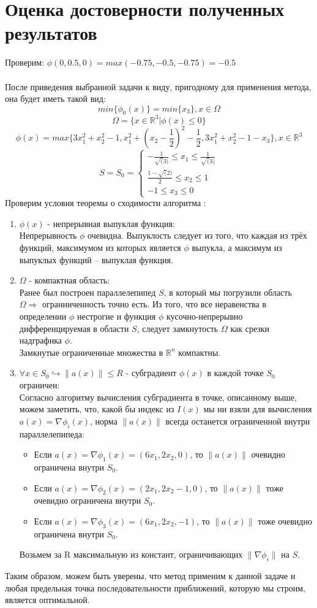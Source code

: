 \documentclass[main.tex]{subfiles}
\begin{document}
\section{Оценка достоверности полученных результатов}
Проверим: $\phi(0, 0.5, 0) = max(-0.75, -0.5, -0.75) = -0.5$\\ \\
После приведения выбранной задачи к виду, пригодному для применения метода, она будет иметь такой вид: 
$$min\{\phi_0(x)\} = min\{x_3\}, x \in \Omega$$
$$\Omega = \{x \in \mathds{R}^3 | \phi(x) \leq 0\}$$
$$\phi(x) = max\{3x_1^2 + x_2^2 - 1, x_1^2 + (x_2 -\frac{1}{2})^2 - \frac{1}{2}, 3x_1^2 + x_2^2 - 1 - x_3\}, x \in \mathds{R}^3$$
\begin{equation*}
S = S_0 = 
\begin{cases}
-\frac{1}{\sqrt(3)} \leq x_1 \leq \frac{1}{\sqrt(3)}\\
\frac{1-\sqrt(2)}{2} \leq x_2 \leq 1\\
-1 \leq x_3 \leq 0
\end{cases}
\end{equation*}
Проверим условия теоремы о сходимости алгоритма \cite{petuh}:
\begin{enumerate}
	\item $\phi(x)$ - непрерывная выпуклая функция:\\
	Непрерывность $\phi$ очевидна.
	Выпуклость следует из того, что каждая из трёх функций, максимумом из которых является $\phi$ выпукла, а максимум из выпуклых функций -- выпуклая функция.
	\item $\Omega$ - компактная область:\\
	Ранее был построен параллелепипед $S$, в который мы погрузили область $\Omega \Longrightarrow$ огранниченность точно есть.
	Из того, что все неравенства в определении $\phi$ нестрогие и функция $\phi$ кусочно-непрерывно дифференцируемая в области $S$, следует замкнутость $\varOmega$ как срезки надграфика $\phi$.\\
	Замкнутые ограниченные множества в $\mathds{R}^n$ компактны.
	\item $\forall x \in S_0 \hookrightarrow \|a(x)\| \leq R$ - субградиент $\phi(x)$ в каждой точке $S_0$ ограничен:\\
	Согласно алгоритму вычисления субградиента в точке, описанному выше, можем заметить, что, какой бы индекс из $I(x)$ мы ни взяли для вычисления $a(x) = \nabla \phi_i(x)$, норма $\|a(x)\|$ всегда останется ограниченной внутри параллелепипеда:
	\begin{itemize}
		\item Если $a(x) = \nabla\phi_1(x) = (6x_1, 2x_2, 0)$, то $\|a(x)\|$ очевидно ограничена внутри $S_0$.
		\item Если $a(x) = \nabla\phi_2(x) = (2x_1, 2x_2 - 1, 0)$, то $\|a(x)\|$ тоже очевидно ограничена внутри $S_0$.
		\item Если $a(x) = \nabla\phi_3(x) = (6x_1, 2x_2, -1)$, то $\|a(x)\|$ тоже очевидно ограничена внутри $S_0$.
	\end{itemize}
	Возьмем за R максимальную из констант, ограничивающих $\|\nabla\phi_i\|$ на $S$.
\end{enumerate}
Таким образом, можем быть уверены, что метод применим к данной задаче и любая предельная точка последовательности приближений, которую мы строим, является оптимальной.
\end{document}
